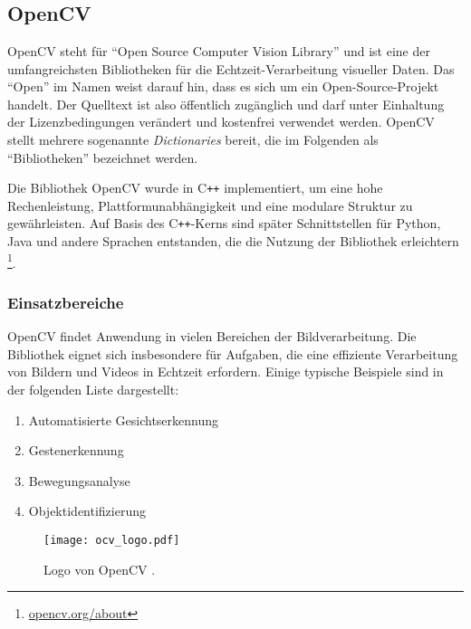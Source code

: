 \chapter{\chapTwo}
\label{cha:chapter2} %

\begingroup
\fontsize{12pt}{14pt}\selectfont

\section{OpenCV}
\label{sec:ocv} %
OpenCV steht für \enquote{Open Source Computer Vision Library} und ist eine der umfangreichsten Bibliotheken für die Echtzeit-Verarbeitung visueller Daten.
Das \enquote{Open} im Namen weist darauf hin, dass es sich um ein Open-Source-Projekt handelt.
Der Quelltext ist also öffentlich zugänglich und darf unter Einhaltung der Lizenzbedingungen verändert und kostenfrei verwendet werden.
OpenCV stellt mehrere sogenannte \textit{Dictionaries} bereit, die im Folgenden als \enquote{Bibliotheken} bezeichnet werden.

Die Bibliothek OpenCV wurde in C\texttt{++} implementiert, um eine hohe Rechenleistung, Plattformunabhängigkeit und eine modulare Struktur zu gewährleisten.
Auf Basis des C\texttt{++}-Kerns sind später Schnittstellen für Python, Java und andere Sprachen entstanden, die die Nutzung der Bibliothek erleichtern \cite{ocv:org}\footnote{\url{opencv.org/about}}.

\subsection{Einsatzbereiche}
OpenCV findet Anwendung in vielen Bereichen der Bildverarbeitung.
Die Bibliothek eignet sich insbesondere für Aufgaben, die eine effiziente Verarbeitung von Bildern und Videos in Echtzeit erfordern.
Einige typische Beispiele sind in der folgenden Liste\footnotemark{} dargestellt:

\begin{minipage}{0.55\textwidth}
    \begin{enumerate}
        \item Automatisierte Gesichtserkennung
        \item Gestenerkennung
        \item Bewegungsanalyse
        \item Objektidentifizierung
    \end{enumerate}
\end{minipage}
\hfill
\begin{minipage}{0.4\textwidth}
    \begin{figure}[H]
        \centering
            \texttt{[image: ocv\_logo.pdf]}
        \caption{Logo von OpenCV \cite{ocv:org}.}
            \label{pic:ocv_logo}
    \end{figure}
\end{minipage}

